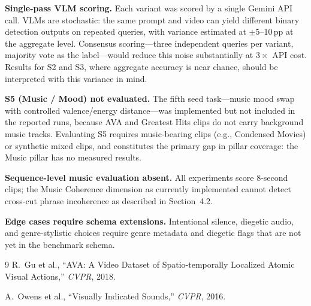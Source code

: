 \documentclass[11pt]{article}
\begin{document}
\textbf{Single-pass VLM scoring.} Each variant was scored by a single Gemini API call.
VLMs are stochastic: the same prompt and video can yield different binary detection
outputs on repeated queries, with variance estimated at $\pm$5--10\,pp at the aggregate
level. Consensus scoring---three independent queries per variant, majority vote as the
label---would reduce this noise substantially at $3\times$ API cost. Results for S2 and
S3, where aggregate accuracy is near chance, should be interpreted with this variance in mind.

\textbf{S5 (Music / Mood) not evaluated.} The fifth seed task---music mood swap with
controlled valence/energy distance---was implemented but not included in the reported
runs, because AVA and Greatest Hits clips do not carry background music tracks. Evaluating
S5 requires music-bearing clips (e.g., Condensed Movies) or synthetic mixed clips, and
constitutes the primary gap in pillar coverage: the Music pillar has no measured results.

\textbf{Sequence-level music evaluation absent.} All experiments score 8-second clips;
the Music Coherence dimension as currently implemented cannot detect cross-cut phrase
incoherence as described in Section~4.2.

\textbf{Edge cases require schema extensions.} Intentional silence, diegetic audio, and
genre-stylistic choices require genre metadata and diegetic flags that are not yet in
the benchmark schema.

\begin{thebibliography}{9}
R.~Gu et al., ``AVA: A Video Dataset of Spatio-temporally Localized Atomic Visual Actions,''
\emph{CVPR}, 2018.

A.~Owens et al., ``Visually Indicated Sounds,'' \emph{CVPR}, 2016.
\end{thebibliography}
\end{document}
